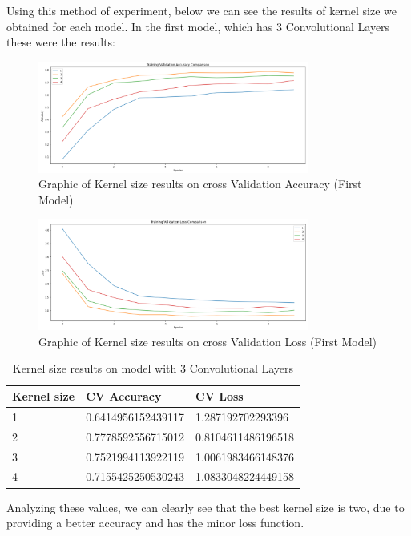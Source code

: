 \documentclass[conference]{IEEEtran}
\begin{document}
Using this method of experiment, below we can see the results of kernel size we obtained for each model. In the first model, which has 3 Convolutional Layers these were the results:

\begin{figure}[H]
    \centering
    \includegraphics[width=3.5in]{pictures/model1_kernel_size_accuracy.png}
    \caption{Graphic of Kernel size results on cross Validation Accuracy (First Model)}\label{fig:example4}
\end{figure}

\begin{figure}[H]
    \centering
    \includegraphics[width=3.5in]{pictures/model1_kernel_size_loss.png}
    \caption{Graphic of Kernel size results on cross Validation Loss (First Model)}\label{fig:example4}
\end{figure}

\begin{table}[H]
\centering
\caption{Kernel size results on model with 3 Convolutional Layers}
\begin{tabular}{ | m{2.5em} | m{3.2cm}| m{3.2cm} | }
\hline
Kernel size & CV Accuracy & CV Loss \\ 
\hline
1 & 0.6414956152439117 & 1.287192702293396 \\
\hline
2 & 0.7778592556715012 & 0.8104611486196518 \\
\hline
3 & 0.7521994113922119 & 1.0061983466148376 \\
\hline
4 & 0.7155425250530243 & 1.0833048224449158 \\
\hline
\end{tabular}
\end{table}

Analyzing these values, we can clearly see that the best kernel size is two, due to providing a better accuracy and has the minor loss function.
\end{document}
